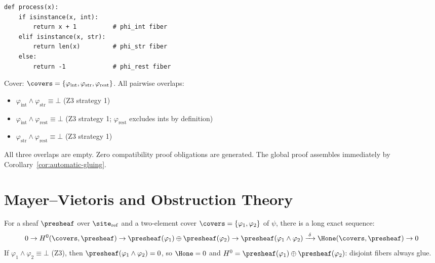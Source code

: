 \begin{example}
\label{ex:isinstance-overlap}
\begin{lstlisting}
def process(x):
    if isinstance(x, int):
        return x + 1          # phi_int fiber
    elif isinstance(x, str):
        return len(x)         # phi_str fiber
    else:
        return -1             # phi_rest fiber
\end{lstlisting}
Cover: $\covers = \{\varphi_{\mathrm{int}}, \varphi_{\mathrm{str}},
\varphi_{\mathrm{rest}}\}$.  All pairwise overlaps:
\begin{itemize}
\item $\varphi_{\mathrm{int}} \wedge \varphi_{\mathrm{str}} \equiv \bot$
  (Z3 strategy 1)
\item $\varphi_{\mathrm{int}} \wedge \varphi_{\mathrm{rest}} \equiv \bot$
  (Z3 strategy 1; $\varphi_{\mathrm{rest}}$ excludes ints by definition)
\item $\varphi_{\mathrm{str}} \wedge \varphi_{\mathrm{rest}} \equiv \bot$
  (Z3 strategy 1)
\end{itemize}
All three overlaps are empty.  Zero compatibility proof obligations are
generated.  The global proof assembles immediately by
Corollary~\ref{cor:automatic-gluing}.
\end{example}


\section{Mayer--Vietoris and Obstruction Theory}
\label{sec:mayer-vietoris}

\begin{theorem}
\label{thm:mayer-vietoris-ref}
For a sheaf $\presheaf$ over $\site_{\mathrm{ref}}$ and a two-element cover
$\covers = \{\varphi_1, \varphi_2\}$ of $\psi$, there is a long exact
sequence:
\[
  0 \to H^0(\covers, \presheaf) \to
  \presheaf(\varphi_1) \oplus \presheaf(\varphi_2) \to
  \presheaf(\varphi_1 \wedge \varphi_2)
  \xrightarrow{\;\delta\;}
  \Hone(\covers, \presheaf) \to 0
\]
If $\varphi_1 \wedge \varphi_2 \equiv \bot$ (Z3), then
$\presheaf(\varphi_1 \wedge \varphi_2) = 0$, so $\Hone = 0$ and
$H^0 = \presheaf(\varphi_1) \oplus \presheaf(\varphi_2)$: disjoint
fibers always glue.
\end{theorem}

